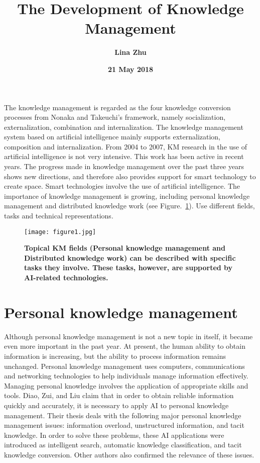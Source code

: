 \documentclass[a4paper,12pt]{article}
\begin{document}
 \title{\textbf{\bfseries \LARGE The Development of Knowledge Management} }
\author{\textbf{Lina Zhu}}
\date{\textbf{21 May 2018}}
\maketitle
	\par The knowledge management is regarded as the four knowledge conversion processes from Nonaka and Takeuchi's framework, namely socialization, externalization, combination and internalization. The knowledge management system based on artificial intelligence mainly supports externalization, composition and internalization. From 2004 to 2007, KM research in the use of artificial intelligence is not very intensive. This work has been active in recent years. The progress made in knowledge management over the past three years shows new directions, and therefore also provides support for smart technology to create space. Smart technologies involve the use of artificial intelligence. The importance of knowledge management is growing, including personal knowledge management and distributed knowledge work (see Figure.~\ref{pic1}). Use different fields, tasks and technical representations.
	\begin{figure}[htp]
		\centering
		\texttt{[image: figure1.jpg]}
		\caption{\bfseries{  Topical KM fields (Personal knowledge management and Distributed knowledge work) can be described with specific tasks they involve. These tasks, however, are supported by AI-related technologies.   }}\label{pic1}
	\end{figure}
	\section{Personal knowledge management}
	Although personal knowledge management is not a new topic in itself, it became even more important in the past year. At present, the human ability to obtain information is increasing, but the ability to process information remains unchanged. Personal knowledge management uses computers, communications and networking technologies to help individuals manage information effectively. Managing personal knowledge involves the application of appropriate skills and tools. Diao, Zui, and Liu claim that in order to obtain reliable information quickly and accurately, it is necessary to apply AI to personal knowledge management. Their thesis deals with the following major personal knowledge management issues: information overload, unstructured information, and tacit knowledge. In order to solve these problems, these AI applications were introduced as intelligent search, automatic knowledge classification, and tacit knowledge conversion. Other authors also confirmed the relevance of these issues.
	
\end{document}
